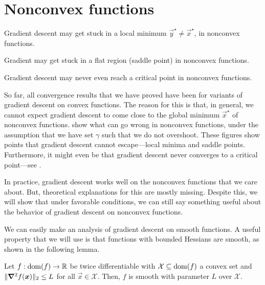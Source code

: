 \section{Nonconvex functions}

\begin{marginfigure}
    \centering
    \caption{Gradient descent may get stuck in a local minimum $\vec{y}^\star \neq \vec{x}^\star$, in nonconvex functions.}
    \label{fig:local-minimum}
\end{marginfigure}

\begin{marginfigure}
    \centering
    \caption{Gradient may get stuck in a flat region (saddle point) in nonconvex functions.}
    \label{fig:saddle-point}
\end{marginfigure}

\begin{marginfigure}
    \centering
    \caption{Gradient descent may never even reach a critical point in nonconvex functions.}
    \label{fig:no-critical-point}
\end{marginfigure}

So far, all convergence results that we have proved have been for variants of gradient descent on
convex functions. The reason for this is that, in general, we cannot expect gradient descent to
come close to the global minimum $\vec{x}^\star$ of nonconvex functions.
 show what can go wrong in nonconvex
functions, under the assumption that we have set $\gamma$ such that we do not overshoot. These
figures show points that gradient descent cannot escape---local minima and saddle points.
Furthermore, it might even be that gradient descent never converges to a critical point---see
.

In practice, gradient descent works well on the nonconvex functions that we care about. But,
theoretical explanations for this are mostly missing. Despite this, we will show that under
favorable conditions, we can still say something useful about the behavior of gradient descent on
nonconvex functions.

We can easily make an analysis of gradient descent on smooth functions. A useful property that we
will use is that functions with bounded Hessians are smooth, as shown in the following lemma.

\begin{lemma}
    Let $f: \mathrm{dom}(f) \to \mathbb{R}$ be twice differentiable with $\mathcal{X} \subseteq \mathrm{dom}(f)$ a convex set and
    $\| \bm{\nabla}^2_{\! } f(\bm{x}) \|_2 \leq L$ for all $\vec{x} \in \mathcal{X}$. Then, $f$ is smooth with
    parameter $L$ over $\mathcal{X}$.
\end{lemma}

